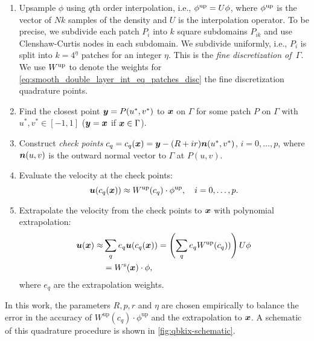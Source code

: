 \begin{enumerate}
  \item Upsample $\phi$ using $q$th order
    interpolation, i.e., $\phi^{\mathrm{up}} = U\phi$, where $\phi^{\mathrm{up}}$ is
    the vector of $Nk$ samples of the density and
    $U$ is the interpolation operator.
    To be precise, we subdivide each patch $P_i$ into $k$ square
    subdomains $P_{ik}$ and use Clenshaw-Curtis nodes in each subdomain.
    We subdivide uniformly, i.e., $P_i$ is split into
    $k=4^\eta$ patches for an integer $\eta$.
    This is the \textit{fine discretization of \,$\Gamma$}. 
    We use $W^{\mathrm{up}}$ to denote the weights for
    \cref{eq:smooth_double_layer_int_eq_patches_disc} the fine discretization quadrature points.
    
  \item Find the closest point ${\bm{y}} = P(u^*,v^*)$ to ${\bm{x}}$ on $\Gamma$ for some
  patch $P$ on $\Gamma$ with $u^*,v^*\in [-1,1]$ (${\bm{y}} = {\bm{x}}$ if ${\bm{x}} \in \Gamma$). 
\item Construct \emph{check points} $c_q =c_q({\bm{x}}) = {\bm{y}} -(R + ir) {\bm{n}}(u^*,v^*) $,
  $i=0,\ldots, p$, where ${\bm{n}}(u,v)$ is the outward normal vector to $\Gamma$ at $P(u,v)$. 
  \item Evaluate the velocity at the check points:
    \begin{equation}
      {\bm{u}}(c_q({\bm{x}})) \approx W^{\mathrm{up}}(c_q)\cdot\phi^{\text{up}},\quad i=0,\ldots, p.
      \label{eq:quad_check_points}
    \end{equation}
  \item Extrapolate the velocity from the check points to ${\bm{x}}$ with  polynomial extrapolation: 
    \begin{align}
      {\bm{u}}({\bm{x}}) \approx& \sum_q e_q {\bm{u}}(c_q({\bm{x}})) = \left(\sum_q e_q W^{\mathrm{up}}(c_q))\right) U \phi \label{eq:sing-quad}\\
      &= W^{\mathrm{s}}({\bm{x}}) \cdot \phi,
    \end{align}      
where $e_q$ are the extrapolation weights.
\end{enumerate}
In this work, the parameters $R,p,r$ and $\eta$ are chosen empirically
to balance the
error in the accuracy of $W^{\text{up}}(c_q) \cdot
\phi^{\text{up}}$ and the extrapolation to
${\bm{x}}$. A schematic of this quadrature procedure is shown in
\cref{fig:qbkix-schematic}.


